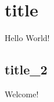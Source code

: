 \documentclass {article}
\begin{document}
\section*{title}
Hello World!
\subsection{title_{2}}
Welcome!
\end{document}
